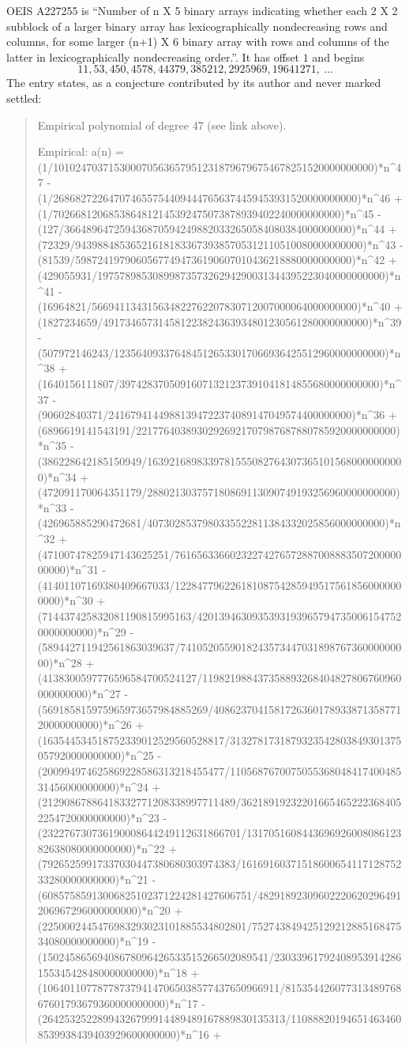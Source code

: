 \documentclass[11pt,a4paper]{article}
\theoremstyle{plain}
\theoremstyle{definition}
\begin{document}
OEIS A227255 is ``Number of n X 5 binary arrays indicating whether each 2 X 2 subblock of a larger binary array has lexicographically nondecreasing rows and columns, for some larger (n+1) X 6 binary array with rows and columns of the latter in lexicographically nondecreasing order.''. It has offset $1$ and begins
\[
11, 53, 450, 4578, 44379, 385212, 2925969, 19641271,\ \dots
\]
The entry states, as a conjecture contributed by its author and never marked settled:
\begin{quote}
Empirical polynomial of degree 47 (see link above).

Empirical: a(n) = (1/1010247037153000705636579512318796796754678251520000000000)*n\^{}47 - (1/2686827226470746557544094447656374459453931520000000000)*n\^{}46 + (1/7026681206853864812145392475073878939402240000000000)*n\^{}45 - (127/3664896472594368705942498820332650584080384000000000)*n\^{}44 + (72329/9439884853652161818336739385705312110510080000000000)*n\^{}43 - (81539/59872419790605677494736190607010436218880000000000)*n\^{}42 + (429055931/1975789853089987357326294290031344395223040000000000)*n\^{}41 - (16964821/566941134315634822762207830712007000064000000000)*n\^{}40 + (1827234659/491734657314581223824363934801230561280000000000)*n\^{}39 - (507972146243/1235640933764845126533017066936425512960000000000)*n\^{}38 + (1640156111807/39742837050916071321237391041814855680000000000)*n\^{}37 - (90602840371/24167941449881394722374089147049574400000000)*n\^{}36 + (6896619141543191/22177640389302926921707987687880785920000000000)*n\^{}35 - (386228642185150949/16392168983397815550827643073651015680000000000)*n\^{}34 + (472091170064351179/288021303757180869113090749193256960000000000)*n\^{}33 - (426965885290472681/4073028537980335522811384332025856000000000)*n\^{}32 + (47100747825947143625251/7616563366023227427657288700888350720000000000)*n\^{}31 - (41401107169380409667033/122847796226181087542859495175618560000000000)*n\^{}30 + (714437425832081190815995163/42013946309353931939657947350061547520000000000)*n\^{}29 - (589442711942561863039637/741052055901824357344703189876736000000000)*n\^{}28 + (4138300597776596584700524127/119821988437358893268404827806760960000000000)*n\^{}27 - (569185815975965973657984885269/408623704158172636017893387135877120000000000)*n\^{}26 + (163544534518752339012529560528817/3132781731879323542803849301375057920000000000)*n\^{}25 - (200994974625869228586313218455477/110568767007505536804841740048531456000000000)*n\^{}24 + (21290867886418332771208338997711489/362189192322016654652223684052254720000000000)*n\^{}23 - (232276730736190008644249112631866701/131705160844369692600808612382638080000000000)*n\^{}22 + (79265259917337030447380680303974383/1616916037151860065411712875233280000000000)*n\^{}21 - (60857585913006825102371224281427606751/48291892309602220620296491206967296000000000)*n\^{}20 + (2250002445476983293023101885534802801/75274384942512921288516847534080000000000)*n\^{}19 - (15024586569408678096426533515266502089541/23033961792408953914286155345428480000000000)*n\^{}18 + (1064011077877873794147065038577437650966911/81535442607731348976867601793679360000000000)*n\^{}17 - (26425325228994326799914489489167889830135313/110888201946514634608539938439403929600000000)*n\^{}16 + 
\end{quote}
\end{document}
